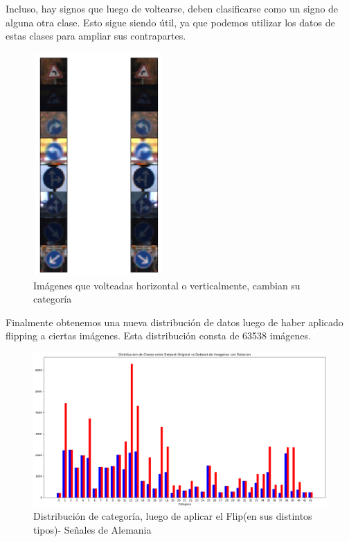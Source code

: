 			Incluso, hay signos que luego de voltearse, deben clasificarse como un signo de alguna otra clase. Esto sigue siendo útil, ya que podemos utilizar los datos de estas clases para ampliar sus contrapartes.
			\begin{figure}[H]
				\begin{center}
				\includegraphics[width=5cm ,height=8.5cm ]{images/desarrollo/Augment/cross_flippable}
				\end{center}
				\begin{center}
				\caption{\small{Imágenes que volteadas horizontal o verticalmente, cambian su categoría}}		
				{\small{\fontsize{10}{16.8}\selectfont {Fuente: Elaboración propia}}}
				\end{center}
				\vspace{-1.5em}
			\end{figure}


			Finalmente obtenemos una nueva distribución de datos luego de haber aplicado flipping a ciertas imágenes. Esta distribución consta de 63538 imágenes.
			\begin{figure}[H]
				\begin{center}
				\includegraphics[width=1\textwidth]{images/desarrollo/histograms/train_flipped63538}
				\end{center}
				\begin{center}
				\vspace{1em}
				\caption{\small{Distribución de categoría, luego de aplicar el Flip(en sus distintos tipos)- Señales de Alemania}}
				{\small{\fontsize{10}{16.8}\selectfont {Fuente: Elaboración propia}}}
				\end{center}
				\vspace{-1.5em}
			\end{figure}

